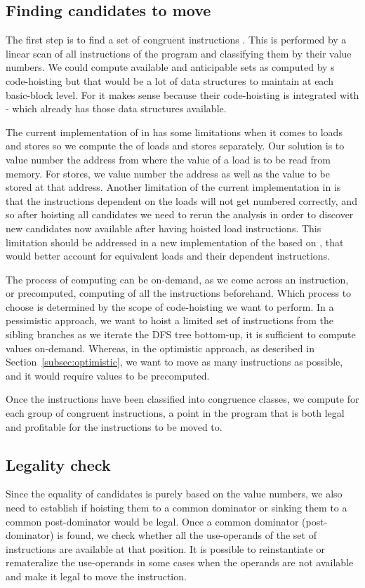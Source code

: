 \documentclass[acmlarge,review,anonymous]{acmart}\settopmatter{printfolios=true}
\begin{document}
\subsection{Finding candidates to move}
\label{subsec:finding-candidates}
The first step is to find a set of congruent instructions
\cite{briggs1997}. This is performed by a linear scan of all instructions of the
program and classifying them by their value numbers. We could compute available
and anticipable sets as computed by s code-hoisting but that would be a lot
of data structures to maintain at each basic-block level. For \GCC{} it makes sense
because their code-hoisting is integrated with \GVN{}-\PRE{} which already has those
data structures available.

The current implementation of \GVN{} in \LLVM{} has some limitations when it
comes to loads and stores so we compute the \GVN{} of loads and stores
separately.  Our solution is to value number the address from where the value of
a load is to be read from memory. For stores, we value number the address as
well as the value to be stored at that address. Another limitation of the
current \GVN{} implementation in \LLVM{} is that the instructions dependent on
the loads will not get numbered correctly, and so after hoisting all candidates
we need to rerun the \GVN{} analysis in order to discover new candidates now
available after having hoisted load instructions.  This limitation should be
addressed in a new implementation of the \GVN{} based on \MemorySSA{}, that
would better account for equivalent loads and their dependent instructions.

The process of computing \GVN{} can be on-demand, as we come across an
instruction, or precomputed, computing \GVN{} of all the instructions
beforehand. Which process to choose is determined by the scope of code-hoisting
we want to perform. In a pessimistic approach, we want to hoist a limited set of
instructions from the sibling branches as we iterate the DFS tree bottom-up, it
is sufficient to compute \GVN{} values on-demand. Whereas, in the optimistic
approach, as described in Section~\ref{subsec:optimistic}, we want to move as
many instructions as possible, and it would require \GVN{} values to be
precomputed.

Once the instructions have been classified into congruence classes, we compute
for each group of congruent instructions, a point in the program that is both
legal and profitable for the instructions to be moved to.

\subsection{Legality check}
\label{subsec:legality}
Since the equality of candidates is purely based on the value numbers, we also
need to establish if hoisting them to a common dominator or sinking them to a
common post-dominator would be legal. Once a common dominator (post-dominator)
is found, we check whether all the use-operands of the set of instructions are
available at that position. It is possible to reinstantiate or remateralize the
use-operands in some cases when the operands are not available and make it legal
to move the instruction.
\end{document}
